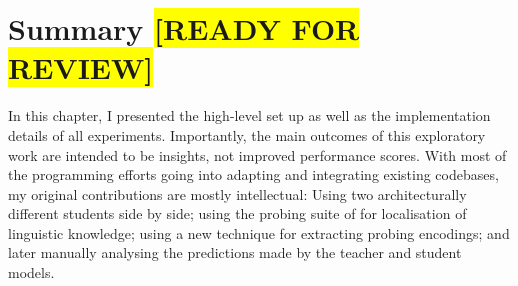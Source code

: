 \documentclass[bsc,frontabs,twoside,singlespacing,parskip,deptreport]{infthesis}
\def\reviewready{\colorbox{yellow}{[READY FOR REVIEW]}}
\begin{document}
{  \section{Summary \reviewready}{
    In this chapter, I presented the high-level set up as well as the implementation details of all experiments.
    Importantly, the main outcomes of this exploratory work are intended to be insights, not improved performance scores.
    With most of the programming efforts going into adapting and integrating existing codebases, my original contributions are mostly intellectual: 
    Using two architecturally different students side by side; 
    using the probing suite of \citet{Conneau_2018} for localisation of linguistic knowledge;
    using a new technique for extracting probing encodings; 
    and later manually analysing the predictions made by the teacher and student models.
  }
}
\end{document}
